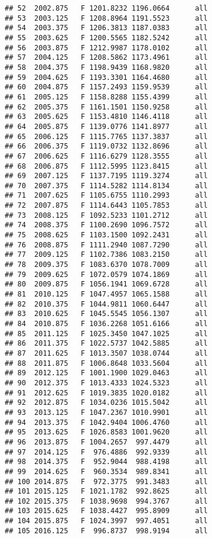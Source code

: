 \documentclass[]{article}
\begin{document}
\begin{verbatim}
## 52  2002.875   F 1201.8232 1196.0664      all
## 53  2003.125   F 1208.8964 1191.5523      all
## 54  2003.375   F 1206.3813 1187.0383      all
## 55  2003.625   F 1200.5565 1182.5242      all
## 56  2003.875   F 1212.9987 1178.0102      all
## 57  2004.125   F 1208.5862 1173.4961      all
## 58  2004.375   F 1198.9439 1168.9820      all
## 59  2004.625   F 1193.3301 1164.4680      all
## 60  2004.875   F 1157.2493 1159.9539      all
## 61  2005.125   F 1158.8288 1155.4399      all
## 62  2005.375   F 1161.1501 1150.9258      all
## 63  2005.625   F 1153.4810 1146.4118      all
## 64  2005.875   F 1139.0776 1141.8977      all
## 65  2006.125   F 1115.7765 1137.3837      all
## 66  2006.375   F 1119.0732 1132.8696      all
## 67  2006.625   F 1116.6279 1128.3555      all
## 68  2006.875   F 1112.5995 1123.8415      all
## 69  2007.125   F 1137.7195 1119.3274      all
## 70  2007.375   F 1114.5282 1114.8134      all
## 71  2007.625   F 1105.6755 1110.2993      all
## 72  2007.875   F 1114.6443 1105.7853      all
## 73  2008.125   F 1092.5233 1101.2712      all
## 74  2008.375   F 1100.2690 1096.7572      all
## 75  2008.625   F 1103.1500 1092.2431      all
## 76  2008.875   F 1111.2940 1087.7290      all
## 77  2009.125   F 1102.7386 1083.2150      all
## 78  2009.375   F 1083.6370 1078.7009      all
## 79  2009.625   F 1072.0579 1074.1869      all
## 80  2009.875   F 1056.1941 1069.6728      all
## 81  2010.125   F 1047.4957 1065.1588      all
## 82  2010.375   F 1044.9811 1060.6447      all
## 83  2010.625   F 1045.5545 1056.1307      all
## 84  2010.875   F 1036.2268 1051.6166      all
## 85  2011.125   F 1025.3450 1047.1025      all
## 86  2011.375   F 1022.5737 1042.5885      all
## 87  2011.625   F 1013.3507 1038.0744      all
## 88  2011.875   F 1006.8648 1033.5604      all
## 89  2012.125   F 1001.1900 1029.0463      all
## 90  2012.375   F 1013.4333 1024.5323      all
## 91  2012.625   F 1019.3835 1020.0182      all
## 92  2012.875   F 1034.0236 1015.5042      all
## 93  2013.125   F 1047.2367 1010.9901      all
## 94  2013.375   F 1042.9404 1006.4760      all
## 95  2013.625   F 1026.8583 1001.9620      all
## 96  2013.875   F 1004.2657  997.4479      all
## 97  2014.125   F  976.4886  992.9339      all
## 98  2014.375   F  952.9044  988.4198      all
## 99  2014.625   F  960.3534  989.8341      all
## 100 2014.875   F  972.3775  991.3483      all
## 101 2015.125   F 1021.1782  992.8625      all
## 102 2015.375   F 1038.9698  994.3767      all
## 103 2015.625   F 1038.4427  995.8909      all
## 104 2015.875   F 1024.3997  997.4051      all
## 105 2016.125   F  996.8737  998.9194      all

\end{verbatim}
\end{document}
